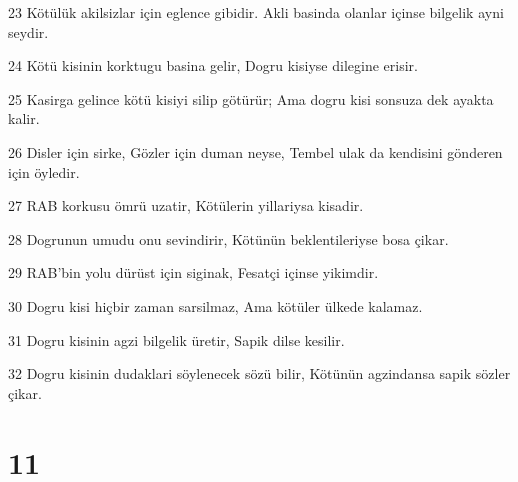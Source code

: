 \par 23 Kötülük akilsizlar için eglence gibidir. Akli basinda olanlar içinse bilgelik ayni seydir.
\par 24 Kötü kisinin korktugu basina gelir, Dogru kisiyse dilegine erisir.
\par 25 Kasirga gelince kötü kisiyi silip götürür; Ama dogru kisi sonsuza dek ayakta kalir.
\par 26 Disler için sirke, Gözler için duman neyse, Tembel ulak da kendisini gönderen için öyledir.
\par 27 RAB korkusu ömrü uzatir, Kötülerin yillariysa kisadir.
\par 28 Dogrunun umudu onu sevindirir, Kötünün beklentileriyse bosa çikar.
\par 29 RAB'bin yolu dürüst için siginak, Fesatçi içinse yikimdir.
\par 30 Dogru kisi hiçbir zaman sarsilmaz, Ama kötüler ülkede kalamaz.
\par 31 Dogru kisinin agzi bilgelik üretir, Sapik dilse kesilir.
\par 32 Dogru kisinin dudaklari söylenecek sözü bilir, Kötünün agzindansa sapik sözler çikar.

\chapter{11}

